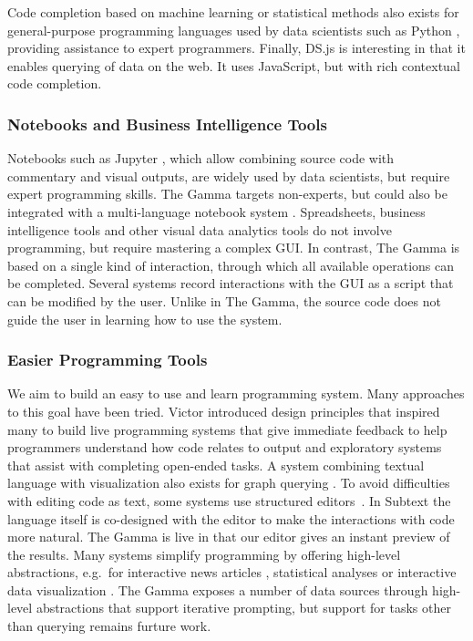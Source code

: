\documentclass[manuscript,review,anonymous]{acmart}
\begin{document}
Code completion based on machine learning or statistical
methods \cite{mlcomplete,statcomplete} also exists for general-purpose programming languages used
by data scientists such as Python \cite{pythia}, providing assistance to expert programmers.
Finally, DS.js \cite{dsjs} is interesting in that it enables querying of data on the
web. It uses JavaScript, but with rich contextual code completion.

\subsubsection*{Notebooks and Business Intelligence Tools}

Notebooks such as Jupyter \cite{jupyter}, which allow combining source code with commentary and
visual outputs, are widely used by data scientists, but require expert programming skills.
The Gamma targets non-experts, but could also be integrated with a multi-language notebook system
\cite{wrattler}.
%
Spreadsheets, business intelligence tools \cite{tableau,powerbi} and other visual data analytics
tools \cite{control,vizdom} do not involve programming, but require mastering a complex GUI.
In contrast, The Gamma is based on a single kind of interaction, through which all available operations
can be completed. Several systems \cite{potter,wrangler,lyra} record interactions with the GUI
as a script that can be modified by the user. Unlike in The Gamma, the source code does not
guide the user in learning how to use the system.

\subsubsection*{Easier Programming Tools}
We aim to build an easy to use and learn programming system. Many approaches to this
goal have been tried. Victor \cite{principle} introduced design principles that
inspired many to build live programming systems \cite{review,liveroad,lighttable} that give
immediate feedback to help programmers understand how code relates to output and
exploratory systems \cite{variolite,exploratory} that assist with completing open-ended tasks.
A system combining textual language with visualization also exists for graph querying \cite{guess}.
To avoid difficulties with editing code as text, some systems use structured editors~\cite{structure-based,livenut,lamdu}.
In Subtext \cite{subtext,directprog} the language itself is co-designed with the editor to make
the interactions with code more natural. The Gamma is live in that our editor gives an instant
preview of the results.
%
Many systems simplify programming by offering high-level abstractions,
e.g.~for interactive news articles \cite{idyll}, statistical analyses \cite{tea}
or interactive data visualization \cite{interactionviz,vegalite}. The Gamma exposes a number
of data sources through high-level abstractions that support iterative prompting, but support
for tasks other than querying remains furture work.
\end{document}
